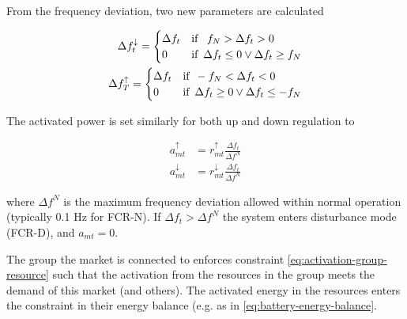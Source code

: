 \documentclass[]{report}
\newcommand{\aup}{a^{\uparrow}}
\newcommand{\adown}{a^{\downarrow}}
\newcommand{\rup}{r^{\uparrow}}
\newcommand{\rdown}{r^{\downarrow}}
\newcommand{\dfup}{\Delta f^\uparrow}
\newcommand{\dfdown}{\Delta f^\downarrow}
\begin{document}
From the frequency deviation, two new parameters are calculated

\begin{align}
    \dfdown_t = 
        \begin{cases}
            \Delta f_t & \text{if \, } f_N > \Delta f_t > 0 \\
            0 & \text{if \,} \Delta  f_t \leq 0 \vee \Delta f_t \geq f_N 
        \end{cases} \\
    \dfup_T = 
        \begin{cases}
            \Delta f_t & \text{if \,} -f_N < \Delta f_t < 0 \\
            0 & \text{if \,}\Delta  f_t \geq 0 \vee \Delta f_t \leq -f_N
        \end{cases}
\end{align}

The activated power is set similarly for both up and down regulation to  

\begin{align}
    \label{eq:fcr-capacity-activation}
    \aup_{mt} &= \rup_{mt} \frac{\Delta f_t}{\Delta f^N}  \\
    \adown_{mt} &= \rdown_{mt} \frac{\Delta f_t}{\Delta f^N} 
\end{align}

where $\Delta f^N$ is the maximum frequency deviation allowed within normal operation (typically 0.1 Hz for FCR-N). If $\Delta f_t > \Delta f^N$ the system enters disturbance mode (FCR-D), and $a_{mt} = 0$.


The group the market is connected to enforces constraint \ref{eq:activation-group-resource} such that the activation from the resources in the group meets the demand of this market (and others). The activated energy in the resources enters the constraint in their energy balance (e.g. as in \ref{eq:battery-energy-balance}. %


\end{document}
